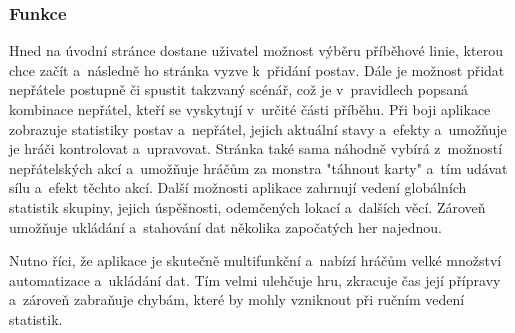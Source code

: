 \subsubsection*{Funkce}
Hned na úvodní stránce dostane uživatel možnost výběru příběhové linie, kterou chce začít a~následně ho stránka vyzve k~přidání postav. Dále je možnost přidat nepřátele postupně či spustit takzvaný scénář, což je v~pravidlech popsaná kombinace nepřátel, kteří se vyskytují v~určité části příběhu. Při boji aplikace zobrazuje statistiky postav a~nepřátel, jejich aktuální stavy a~efekty a~umožňuje je hráči kontrolovat a~upravovat. Stránka také sama náhodně vybírá z~možností nepřátelských akcí a~umožňuje hráčům za monstra "táhnout karty" a~tím udávat sílu a~efekt těchto akcí. Další možnosti aplikace zahrnují vedení globálních statistik skupiny, jejich úspěšnosti, odemčených lokací a~dalších věcí. Zároveň umožňuje ukládání a~stahování dat několika započatých her najednou.

Nutno říci, že aplikace je skutečně multifunkční a~nabízí hráčům velké množství automatizace a~ukládání dat. Tím velmi ulehčuje hru, zkracuje čas její přípravy a~zároveň zabraňuje chybám, které by mohly vzniknout při ručním vedení statistik.
